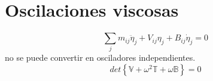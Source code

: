 \documentclass[10pt,oneside]{CBFT_book}
\begin{document}
\section{Oscilaciones viscosas}

\[
	\sum_j m_{ij} \ddot{\eta}_j + V_{ij}\eta_j + B_{ij}\dot{\eta}_j = 0
\]
no se puede convertir en osciladores independientes.
\[
	det\left\{ \mathbb{V} + \omega^2 \mathbb{T} + \omega \mathbb{B}\right\} = 0
\]






\end{document}
